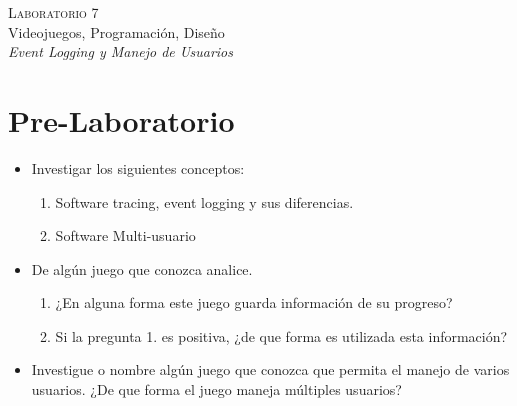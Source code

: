 \begin{center}
\textsc{\Large Laboratorio 7}~\\
{\large Videojuegos, Programación, Diseño}~\\
\emph{Event Logging y Manejo de Usuarios}
\end{center}

\section{Pre-Laboratorio}
\begin{itemize}
\item Investigar los siguientes conceptos:
\begin{enumerate}
  \item Software tracing, event logging y sus diferencias.
  \item Software Multi-usuario
\end{enumerate}
\item De algún juego que conozca analice.
\begin{enumerate}
  \item ¿En alguna forma este juego guarda información de su progreso?
  \item Si la pregunta 1. es positiva, ¿de que forma es utilizada esta información?
\end{enumerate}
\item Investigue o nombre algún juego que conozca que permita el manejo de varios usuarios. ¿De que forma el juego maneja múltiples usuarios?
\end{itemize}

